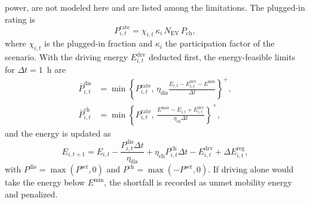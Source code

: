 power, are not modeled here and are listed among the limitations. The plugged-in rating is
\begin{equation}
P^{\mathrm{rate}}_{i,t}=\chi_{i,t}\,\kappa_i\,N_{\mathrm{EV}}\,P_{\mathrm{ch}},
\label{eq:prate}
\end{equation}
where $\chi_{i,t}$ is the plugged-in fraction and $\kappa_i$ the
participation factor of the scenario. With the driving energy
$E^{\mathrm{drv}}_{i,t}$ deducted first, the energy-feasible limits
for $\Delta t=1$~h are
\begin{align}
\bar P^{\mathrm{dis}}_{i,t}&=\min\!\left\{P^{\mathrm{rate}}_{i,t},\,
\eta_{\mathrm{dis}}\frac{E_{i,t}-E^{\mathrm{drv}}_{i,t}-E^{\min}}{\Delta t}\right\}^{+},
\label{eq:pdis}\\
\bar P^{\mathrm{ch}}_{i,t}&=\min\!\left\{P^{\mathrm{rate}}_{i,t},\,
\frac{E^{\max}-E_{i,t}+E^{\mathrm{drv}}_{i,t}}{\eta_{\mathrm{ch}}\Delta t}\right\}^{+},
\label{eq:pch}
\end{align}
and the energy is updated as
\begin{equation}
E_{i,t+1}=E_{i,t}-\frac{P^{\mathrm{dis}}_{i,t}\Delta t}{\eta_{\mathrm{dis}}}
+\eta_{\mathrm{ch}}P^{\mathrm{ch}}_{i,t}\Delta t-E^{\mathrm{drv}}_{i,t}
+\Delta E^{\mathrm{reg}}_{i,t},
\label{eq:energy}
\end{equation}
with $P^{\mathrm{dis}}=\max(P^{\mathrm{set}},0)$ and
$P^{\mathrm{ch}}=\max(-P^{\mathrm{set}},0)$. If driving alone would take
the energy below $E^{\min}$, the shortfall is recorded as unmet
mobility energy and penalized.

